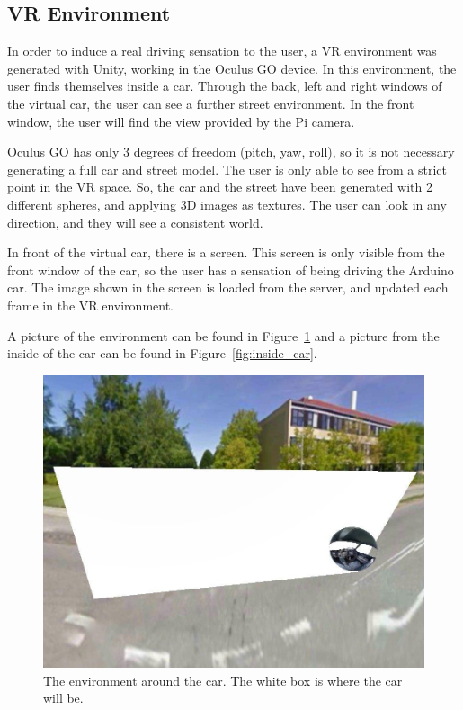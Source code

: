 \subsection{VR Environment}\label{sec:design_vr_enviroment}

In order to induce a real driving sensation to the user, a VR environment was
generated with Unity, working in the Oculus GO device. In this environment,
the user finds themselves inside a car. Through the back, left and right
windows of the virtual car, the user can see a further street environment. In
the front window, the user will find the view provided by the Pi camera.

Oculus GO has only 3 degrees of freedom (pitch, yaw, roll), so it is not
necessary generating a full car and street model. The user is only able to
see from a strict point in the VR space. So, the car and the street have been
generated with 2 different spheres, and applying 3D images as textures. The
user can look in any direction, and they will see a consistent world.

In front of the virtual car, there is a screen. This screen is only visible
from the front window of the car, so the user has a sensation of being driving
the Arduino car. The image shown in the screen is loaded from the server,
and updated each frame in the VR environment.

A picture of the environment can be found in Figure~\ref{fig:environment} and a
picture from the inside of the car can be found in Figure~\ref{fig:inside_car}.

\begin{figure}[H]
  \centering \includegraphics[width=\textwidth / 2]{./screen.jpg}
  \caption{\label{fig:environment} The environment around the car. The white
  box is where the car will be.}
\end{figure}

